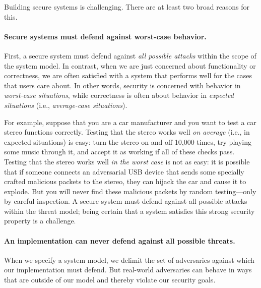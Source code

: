 Building secure systems is challenging.
There are at least two broad reasons for this.

\paragraph{Secure systems must defend against worst-case behavior.}
First, a secure system must defend against
\emph{all possible attacks} within the scope of 
the system model.
In contrast, when we are just concerned about functionality or
correctness, we are often satisfied with a system 
that performs well for the cases that users care about.
In other words, security is concerned with behavior in
\emph{worst-case situations}, while correctness is often
about behavior in 
\emph{expected situations} (i.e., \emph{average-case situations}).

For example, suppose that you are a car manufacturer and you
want to test a car stereo functions correctly.
Testing that the stereo  works well \emph{on average} (i.e., in expected situations)
is easy: turn the stereo on and off 10,000 times, try playing some music
through it, and accept it as working if all of these checks pass.
Testing that the stereo works well \emph{in the worst case} is not as
easy: it is possible that if someone connects an adversarial USB device that sends
some specially crafted malicious packets to the
stereo, they can hijack the car and cause it to explode. But you will never
find these malicious packets by random testing---only by careful 
inspection.
A secure system must defend against all possible attacks within the threat model;
being certain that a system satisfies this strong security property is a challenge.


\paragraph{An implementation can never defend against all possible threats.}
When we specify a system model, we delimit the set of adversaries 
against which our implementation must defend.
But real-world adversaries can behave in ways that are 
outside of our model and thereby violate our security goals.

